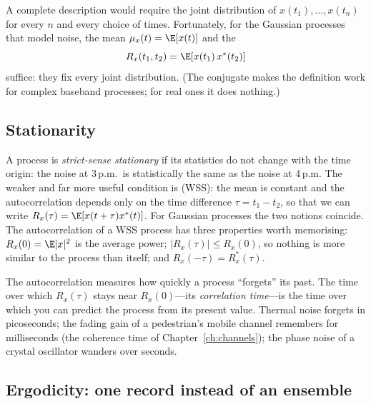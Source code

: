 A complete description would require the joint distribution of $x(t_1),\dots,x(t_n)$ for every $n$
and every choice of times. Fortunately, for the Gaussian processes that model noise, the mean
$\mu_x(t)=\E[x(t)]$ and the 
\begin{equation}
R_x(t_1,t_2)=\E[x(t_1)\,x^*(t_2)]
\end{equation}
suffice: they fix every joint distribution. (The conjugate makes the definition work for complex
baseband processes; for real ones it does nothing.)

\subsection{Stationarity}

A process is \emph{strict-sense stationary} if its statistics do not change with the time origin:
the noise at 3\,p.m.\ is statistically the same as the noise at 4\,p.m. The weaker and far more
useful condition is  (WSS): the mean is constant and the
autocorrelation depends only on the time difference $\tau=t_1-t_2$, so that we can write
$R_x(\tau)=\E[x(t+\tau)x^*(t)]$. For Gaussian processes the two notions coincide. The
autocorrelation of a WSS process has three properties worth memorising: $R_x(0)=\E|x|^2$ is the
average power; $|R_x(\tau)|\le R_x(0)$, so nothing is more similar to the process than itself; and
$R_x(-\tau)=R_x^*(\tau)$.

The autocorrelation measures how quickly a process ``forgets'' its past. The time over which
$R_x(\tau)$ stays near $R_x(0)$---its \emph{correlation time}---is the time over which you can
predict the process from its present value. Thermal noise forgets in picoseconds; the fading gain of
a pedestrian's mobile channel remembers for milliseconds (the coherence time of
Chapter~\ref{ch:channels}); the phase noise of a crystal oscillator wanders over seconds.


\subsection{Ergodicity: one record instead of an ensemble}

